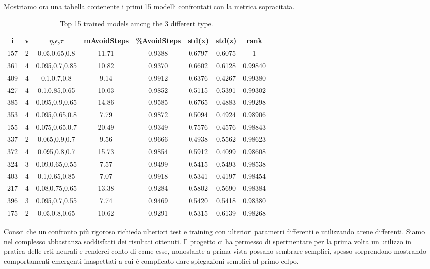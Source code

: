 Mostriamo ora una tabella contenente i primi 15 modelli confrontati con la metrica sopracitata.

\begin{table}[H]
    \centering
    \begin{tabular}{|c|c|c|c|c|c|c|c|}
        \hline
        i	&   v	&	$\eta$,$\epsilon$,$\tau$ &   mAvoidSteps	& \%AvoidSteps & std(x) & std(z) & rank \\
        \hline
        157	    &   2	    &	0.05,0.65,0.8     &   11.71	&   0.9388	&   0.6797	&   0.6075	& 1 \\
        361	    &   4	    &	0.095,0.7,0.85 	&   10.82	&   0.9370	&   0.6602	&   0.6128	& 0.99840 \\
        409	    &   4	    &	0.1,0.7,0.8       &   9.14	&   0.9912	&   0.6376	&   0.4267	& 0.99380 \\
        427	    &   4	    &	0.1,0.85,0.65   	&   10.03	&   0.9852	&   0.5115	&   0.5391	& 0.99302 \\
        385	    &   4	    &	0.095,0.9,0.65   	&   14.86	&   0.9585	&   0.6765	&   0.4883	& 0.99298 \\
        353	    &   4	    &	0.095,0.65,0.8    &   7.79	&   0.9872	&   0.5094	&   0.4924	& 0.98906 \\
        155	    &   4	    &	0.075,0.65,0.7    &   20.49	&   0.9349	&   0.7576	&   0.4576	& 0.98843 \\
        337	    &   2	    &	0.065,0.9,0.7     &   9.56	&   0.9666	&   0.4938	&   0.5562	& 0.98623 \\
        372	    &   4	    &	0.095,0.8,0.7     &   15.73	&   0.9854	&   0.5912	&   0.4099	& 0.98608 \\
        324	    &   3	    &	0.09,0.65,0.55   	&   7.57	&   0.9499	&   0.5415	&   0.5493	& 0.98538 \\
        403	    &   4	    &	0.1,0.65,0.85   	&   7.07	&   0.9918	&   0.5341	&   0.4197	& 0.98454 \\
        217	    &   4	    &	0.08,0.75,0.65   	&   13.38	&   0.9284	&   0.5802	&   0.5690	& 0.98384 \\
        396	    &   3	    &	0.095,0.7,0.55   	&   7.74	&   0.9469	&   0.5420	&   0.5418	& 0.98380 \\
        175	    &   2	    &	0.05,0.8,0.65   	&   10.62	&   0.9291	&   0.5315	&   0.6139	& 0.98268 \\
        \hline
    \end{tabular}
    \caption{Top 15 trained models among the 3 different type.}
    \label{tab:ranks}
\end{table}

Consci che un confronto più rigoroso richieda ulteriori test e training con ulteriori parametri differenti e utilizzando arene differenti. Siamo nel complesso abbastanza soddisfatti dei risultati ottenuti. 
Il progetto ci ha permesso di sperimentare per la prima volta un utilizzo in pratica delle reti neurali e renderci conto di come esse, nonostante a prima vista possano sembrare semplici, spesso sorprendono mostrando comportamenti emergenti inaspettati a cui è complicato dare spiegazioni semplici al primo colpo.  